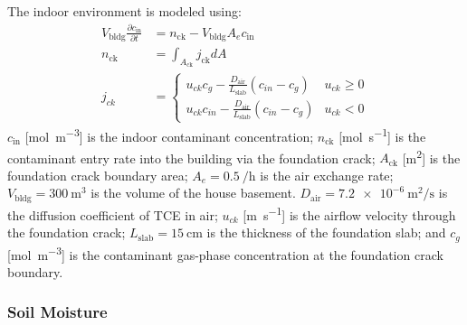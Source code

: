 The indoor environment is modeled using:
\begin{align*}
    V_\mathrm{bldg}\frac{\partial c_\mathrm{in}}{\partial t} &= n_\mathrm{ck} - V_\mathrm{bldg} A_e c_\mathrm{in} \\
    n_\mathrm{ck} &= \int_{A_\mathrm{ck}} j_\mathrm{ck} dA \\
    j_{ck} &= \begin{cases}
      u_{ck} c_g - \frac{D_\mathrm{air}}{L_\mathrm{slab}} (c_{in} - c_g) & u_{ck} \geq 0 \\
      u_{ck} c_{in} - \frac{D_\mathrm{air}}{L_\mathrm{slab}} (c_{in} - c_g) & u_{ck} < 0
  \end{cases}
\end{align*}
$c_\mathrm{in}$ [\si{\mol\per\metre\cubed}] is the indoor contaminant concentration;
$n_\mathrm{ck}$ [\si{\mol\per\second}] is the contaminant entry rate into the building via the foundation crack;
$A_\mathrm{ck}$ [\si{\metre\squared}] is the foundation crack boundary area;
$A_e = \SI{0.5}{\per\hour}$ is the air exchange rate;
$V_\mathrm{bldg} = \SI{300}{\metre\cubed}$ is the volume of the house basement.
$D_\mathrm{air} = \SI{7.2e-6}{\metre\squared\per\second}$ is the diffusion coefficient of TCE in air;
$u_{ck}$ [\si{\metre\per\second}] is the airflow velocity through the foundation crack;
$L_\mathrm{slab} = \SI{15}{\centi\metre}$ is the thickness of the foundation slab;
and $c_g$ [\si{\mol\per\metre\cubed}] is the contaminant gas-phase concentration at the foundation crack boundary.\par

\subsubsection{Soil Moisture}

